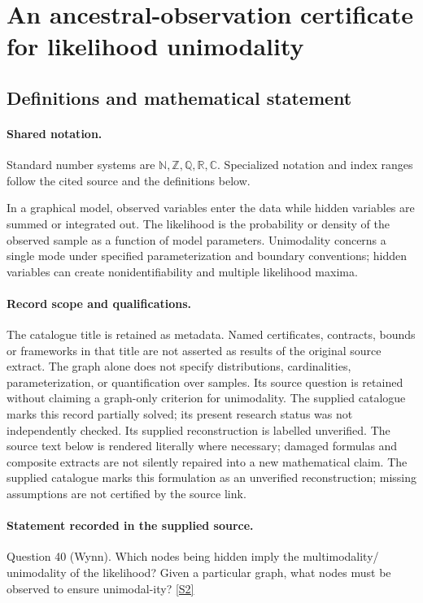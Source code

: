 \documentclass[11pt]{article}
\newcommand{\sref}[2]{\hyperlink{source:#1:#2}{[S#2]}}
\begin{document}
\section{An ancestral-observation certificate for likelihood unimodality}\label{statement}

\subsection{Definitions and mathematical statement}

\paragraph{Shared notation.}Standard number systems are $\mathbb N,\mathbb Z,\mathbb Q,\mathbb R,\mathbb C$. Specialized notation and index ranges follow the cited source and the definitions below.


In a graphical model, observed variables enter the data while hidden variables are summed or integrated out. The likelihood is the probability or density of the observed sample as a function of model parameters. Unimodality concerns a single mode under specified parameterization and boundary conventions; hidden variables can create nonidentifiability and multiple likelihood maxima.
\paragraph{Record scope and qualifications.}
The catalogue title is retained as metadata. Named certificates, contracts, bounds or frameworks in that title are not asserted as results of the original source extract.
The graph alone does not specify distributions, cardinalities, parameterization, or quantification over samples. Its source question is retained without claiming a graph-only criterion for unimodality. The supplied catalogue marks this record partially solved; its present research status was not independently checked. Its supplied reconstruction is labelled unverified.
The source text below is rendered literally where necessary; damaged formulas and composite extracts are not silently repaired into a new mathematical claim.
The supplied catalogue marks this formulation as an unverified reconstruction; missing assumptions are not certified by the source link.
\paragraph{Statement recorded in the supplied source.}
Question 40 (Wynn). Which nodes being hidden imply the multimodality/ unimodality of the likelihood? Given a particular graph, what nodes must be observed to ensure unimodal-ity? \sref{statement}{2}
\end{document}

